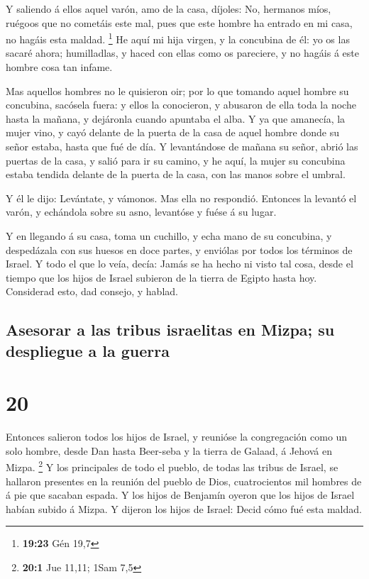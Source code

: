  Y saliendo á ellos aquel varón, amo de la casa, díjoles:
No, hermanos míos, ruégoos que no cometáis este mal, pues que este
hombre ha entrado en mi casa, no hagáis esta maldad. \footnote{\textbf{19:23}
  Gén 19,7}  He aquí mi hija virgen, y la concubina de
él: yo os las sacaré ahora; humilladlas, y haced con ellas como os
pareciere, y no hagáis á este hombre cosa tan infame.

 Mas aquellos hombres no le quisieron oir; por lo que
tomando aquel hombre su concubina, sacósela fuera: y ellos la
conocieron, y abusaron de ella toda la noche hasta la mañana, y
dejáronla cuando apuntaba el alba.  Y ya que amanecía, la
mujer vino, y cayó delante de la puerta de la casa de aquel hombre donde
su señor estaba, hasta que fué de día.  Y levantándose de
mañana su señor, abrió las puertas de la casa, y salió para ir su
camino, y he aquí, la mujer su concubina estaba tendida delante de la
puerta de la casa, con las manos sobre el umbral.

 Y él le dijo: Levántate, y vámonos. Mas ella no
respondió. Entonces la levantó el varón, y echándola sobre su asno,
levantóse y fuése á su lugar.

 Y en llegando á su casa, toma un cuchillo, y echa mano
de su concubina, y despedázala con sus huesos en doce partes, y enviólas
por todos los términos de Israel.  Y todo el que lo veía,
decía: Jamás se ha hecho ni visto tal cosa, desde el tiempo que los
hijos de Israel subieron de la tierra de Egipto hasta hoy. Considerad
esto, dad consejo, y hablad.

\hypertarget{asesorar-a-las-tribus-israelitas-en-mizpa-su-despliegue-a-la-guerra}{%
\subsection{Asesorar a las tribus israelitas en Mizpa; su despliegue a
la
guerra}\label{asesorar-a-las-tribus-israelitas-en-mizpa-su-despliegue-a-la-guerra}}

\hypertarget{section-19}{%
\section{20}\label{section-19}}

 Entonces salieron todos los hijos de Israel, y reunióse
la congregación como un solo hombre, desde Dan hasta Beer-seba y la
tierra de Galaad, á Jehová en Mizpa. \footnote{\textbf{20:1} Jue 11,11;
  1Sam 7,5}  Y los principales de todo el pueblo, de todas
las tribus de Israel, se hallaron presentes en la reunión del pueblo de
Dios, cuatrocientos mil hombres de á pie que sacaban espada.
 Y los hijos de Benjamín oyeron que los hijos de Israel
habían subido á Mizpa. Y dijeron los hijos de Israel: Decid cómo fué
esta maldad.

